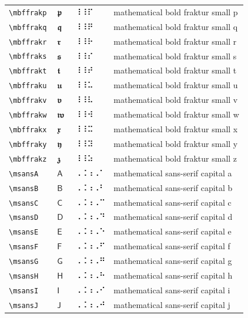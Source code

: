 \documentclass[oneside]{article}
\begin{document}
\begin{longtable}{llll}
\verb|\mbffrakp| & $\mbffrakp$ &  ⠸⠸⠏  & {mathematical bold fraktur small p} \\[2ex]
\verb|\mbffrakq| & $\mbffrakq$ &  ⠸⠸⠟  & {mathematical bold fraktur small q} \\[2ex]
\verb|\mbffrakr| & $\mbffrakr$ &  ⠸⠸⠗  & {mathematical bold fraktur small r} \\[2ex]
\verb|\mbffraks| & $\mbffraks$ &  ⠸⠸⠎  & {mathematical bold fraktur small s} \\[2ex]
\verb|\mbffrakt| & $\mbffrakt$ &  ⠸⠸⠞  & {mathematical bold fraktur small t} \\[2ex]
\verb|\mbffraku| & $\mbffraku$ &  ⠸⠸⠥  & {mathematical bold fraktur small u} \\[2ex]
\verb|\mbffrakv| & $\mbffrakv$ &  ⠸⠸⠧  & {mathematical bold fraktur small v} \\[2ex]
\verb|\mbffrakw| & $\mbffrakw$ &  ⠸⠸⠺  & {mathematical bold fraktur small w} \\[2ex]
\verb|\mbffrakx| & $\mbffrakx$ &  ⠸⠸⠭  & {mathematical bold fraktur small x} \\[2ex]
\verb|\mbffraky| & $\mbffraky$ &  ⠸⠸⠽  & {mathematical bold fraktur small y} \\[2ex]
\verb|\mbffrakz| & $\mbffrakz$ &  ⠸⠸⠵  & {mathematical bold fraktur small z} \\[2ex]
\verb|\msansA| & $\msansA$ &  ⠠⠨⠰⠠⠁  & {mathematical sans-serif capital a} \\[2ex]
\verb|\msansB| & $\msansB$ &  ⠠⠨⠰⠠⠃  & {mathematical sans-serif capital b} \\[2ex]
\verb|\msansC| & $\msansC$ &  ⠠⠨⠰⠠⠉  & {mathematical sans-serif capital c} \\[2ex]
\verb|\msansD| & $\msansD$ &  ⠠⠨⠰⠠⠙  & {mathematical sans-serif capital d} \\[2ex]
\verb|\msansE| & $\msansE$ &  ⠠⠨⠰⠠⠑  & {mathematical sans-serif capital e} \\[2ex]
\verb|\msansF| & $\msansF$ &  ⠠⠨⠰⠠⠋  & {mathematical sans-serif capital f} \\[2ex]
\verb|\msansG| & $\msansG$ &  ⠠⠨⠰⠠⠛  & {mathematical sans-serif capital g} \\[2ex]
\verb|\msansH| & $\msansH$ &  ⠠⠨⠰⠠⠓  & {mathematical sans-serif capital h} \\[2ex]
\verb|\msansI| & $\msansI$ &  ⠠⠨⠰⠠⠊  & {mathematical sans-serif capital i} \\[2ex]
\verb|\msansJ| & $\msansJ$ &  ⠠⠨⠰⠠⠚  & {mathematical sans-serif capital j} \\[2ex]

\end{longtable}
\end{document}
